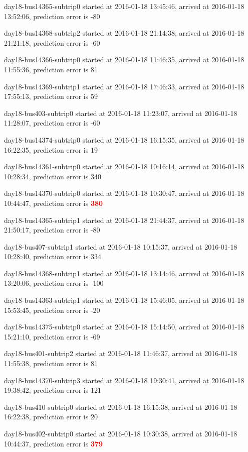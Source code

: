 \documentclass[12pt,a4paper,oneside,openright]{report}
\begin{document}
{\footnotesize
day18-bus14365-subtrip0 started at 2016-01-18 13:45:46, arrived at 2016-01-18 13:52:06, prediction error is -80 

day18-bus14368-subtrip2 started at 2016-01-18 21:14:38, arrived at 2016-01-18 21:21:18, prediction error is -60

day18-bus14366-subtrip0 started at 2016-01-18 11:46:35, arrived at 2016-01-18 11:55:36, prediction error is 81

day18-bus14369-subtrip1 started at 2016-01-18 17:46:33, arrived at 2016-01-18 17:55:13, prediction error is 59

day18-bus403-subtrip0 started at 2016-01-18 11:23:07,    arrived at 2016-01-18 11:28:07, prediction error is -60

day18-bus14374-subtrip0 started at 2016-01-18 16:15:35, arrived at 2016-01-18 16:22:35, prediction error is 19

day18-bus14361-subtrip0 started at 2016-01-18 10:16:14, arrived at 2016-01-18 10:28:34, prediction error is 340

day18-bus14370-subtrip0 started at 2016-01-18 10:30:47, arrived at 2016-01-18 10:44:47, prediction error is \textcolor{red}{\textbf{380}}

day18-bus14365-subtrip1 started at 2016-01-18 21:44:37, arrived at 2016-01-18 21:50:17, prediction error is -80 

day18-bus407-subtrip1 started at 2016-01-18 10:15:37,    arrived at 2016-01-18 10:28:40, prediction error is 334

day18-bus14368-subtrip1 started at 2016-01-18 13:14:46, arrived at 2016-01-18 13:20:06, prediction error is -100

day18-bus14363-subtrip1 started at 2016-01-18 15:46:05, arrived at 2016-01-18 15:53:45, prediction error is -20

day18-bus14375-subtrip0 started at 2016-01-18 15:14:50, arrived at 2016-01-18 15:21:10, prediction error is -69

day18-bus401-subtrip2 started at 2016-01-18 11:46:37,    arrived at 2016-01-18 11:55:38, prediction error is 81

day18-bus14370-subtrip3 started at 2016-01-18 19:30:41, arrived at 2016-01-18 19:38:42, prediction error is 121

day18-bus410-subtrip0 started at 2016-01-18 16:15:38,    arrived at 2016-01-18 16:22:38, prediction error is 20

day18-bus402-subtrip0 started at 2016-01-18 10:30:38,    arrived at 2016-01-18 10:44:37, prediction error is \textcolor{red}{\textbf{379}}

}
\end{document}
